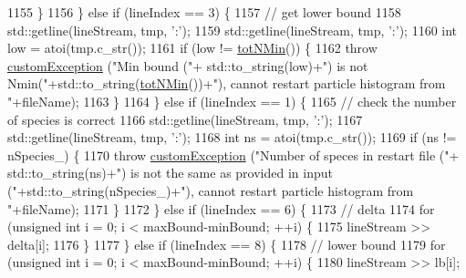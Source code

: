\begin{DoxyCode}
1155                 \}
1156             \} \textcolor{keywordflow}{else} \textcolor{keywordflow}{if} (lineIndex == 3) \{
1157                 \textcolor{comment}{// get lower bound}
1158                 std::getline(lineStream, tmp, \textcolor{charliteral}{':'});
1159                 std::getline(lineStream, tmp, \textcolor{charliteral}{':'});
1160                 \textcolor{keywordtype}{int} low = atoi(tmp.c\_str());
1161                 \textcolor{keywordflow}{if} (low != \hyperlink{classsim_system_af10842e0eaa638373b8717c87b47e6bc}{totNMin}()) \{
1162                     \textcolor{keywordflow}{throw} \hyperlink{classcustom_exception}{customException} (\textcolor{stringliteral}{"Min bound ("}+ std::to\_string(low)+\textcolor{stringliteral}{") is not
       Nmin("}+std::to\_string(\hyperlink{classsim_system_af10842e0eaa638373b8717c87b47e6bc}{totNMin}())+\textcolor{stringliteral}{"), cannot restart particle histogram from "}+fileName);
1163                 \}
1164             \} \textcolor{keywordflow}{else} \textcolor{keywordflow}{if} (lineIndex == 1) \{
1165                 \textcolor{comment}{// check the number of species is correct}
1166                 std::getline(lineStream, tmp, \textcolor{charliteral}{':'});
1167                 std::getline(lineStream, tmp, \textcolor{charliteral}{':'});
1168                 \textcolor{keywordtype}{int} ns = atoi(tmp.c\_str());
1169                 \textcolor{keywordflow}{if} (ns != nSpecies\_) \{
1170                     \textcolor{keywordflow}{throw} \hyperlink{classcustom_exception}{customException} (\textcolor{stringliteral}{"Number of speces in restart file ("}+ 
      std::to\_string(ns)+\textcolor{stringliteral}{") is not the same as provided in input ("}+std::to\_string(nSpecies\_)+\textcolor{stringliteral}{"), cannot restart particle
       histogram from "}+fileName);
1171                 \}
1172             \} \textcolor{keywordflow}{else} \textcolor{keywordflow}{if} (lineIndex == 6) \{
1173                 \textcolor{comment}{// delta}
1174                 \textcolor{keywordflow}{for} (\textcolor{keywordtype}{unsigned} \textcolor{keywordtype}{int} i = 0; i < maxBound-minBound; ++i) \{
1175                     lineStream >> delta[i];
1176                 \}
1177             \} \textcolor{keywordflow}{else} \textcolor{keywordflow}{if} (lineIndex == 8) \{
1178                 \textcolor{comment}{// lower bound}
1179                 \textcolor{keywordflow}{for} (\textcolor{keywordtype}{unsigned} \textcolor{keywordtype}{int} i = 0; i < maxBound-minBound; ++i) \{
1180                     lineStream >> lb[i];

\end{DoxyCode}
